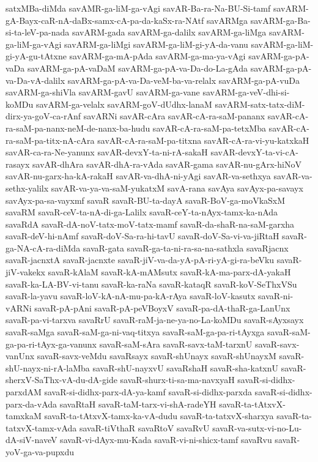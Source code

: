 {satxMBa-diMda
savAMR-ga-liM-ga-vAgi
savAR-Ba-ra-Na-BU-Si-tamf
savARM-gA-Bayx-caR-nA-daBx-samx-cA-pa-da-kaSx-ra-NAtf
savARMga
savARM-ga-Ba-si-ta-leV-pa-nada
savARM-gada
savARM-ga-dalilx
savARM-ga-liMga
savARM-ga-liM-ga-vAgi
savARM-ga-liMgi
savARM-ga-liM-gi-yA-da-vanu
savARM-ga-liM-gi-yA-gu-tAtxne
savARM-ga-mA-pAda
savARM-ga-ma-ya-vAgi
savARM-ga-pA-vaDa
savARM-ga-pA-vaDaM
savARM-ga-pA-va-Da-do-La-gAda
savARM-ga-pA-va-Da-vA-dalilx
savARM-ga-pA-va-Da-veM-ba-va-relalx
savARM-ga-pA-vuDa
savARM-ga-shiVla
savARM-gavU
savARM-ga-vane
savARM-ga-veV-dhi-si-koMDu
savARM-ga-velalx
savARM-goV-dUdhx-lanaM
savARM-satx-tatx-diM-dirx-ya-goV-ca-rAnf
savARNi
savAR-cAra
savAR-cA-ra-saM-pananx
savAR-cA-ra-saM-pa-nanx-neM-de-nanx-ba-hudu
savAR-cA-ra-saM-pa-tetxMba
savAR-cA-ra-saM-pa-titx-nA-cAra
savAR-cA-ra-saM-pa-titxna
savAR-cA-ra-vi-yu-katxkaH
savAR-ca-ra-Ne-yanunx
savAR-devxY-ta-ni-rA-sakaH
savAR-devxY-ta-vi-cA-rasayx
savAR-dhAra
savAR-dhA-ra-vAda
savAR-gama
savAR-nu-gArx-hiNoV
savAR-nu-garx-ha-kA-rakaH
savAR-va-dhA-ni-yAgi
savAR-va-sethxya
savAR-va-sethx-yalilx
savAR-va-ya-va-saM-yukatxM
savA-rana
savAya
savAyx-pa-savayx
savAyx-pa-sa-vayxmf
savaR
savaR-BU-ta-dayA
savaR-BoV-ga-moVkaSxM
savaRM
savaR-ceV-ta-nA-di-ga-Lalilx
savaR-ceY-ta-nAyx-tamx-ka-nAda
savaRdA
savaR-dA-noV-tatx-moV-tatx-mamf
savaR-da-shaR-na-saM-garxha
savaR-deV-hi-nAmf
savaR-doV-Sa-ra-hi-tavU
savaR-doV-Sa-vi-va-jiRtaH
savaR-ga-NA-cA-ra-diMda
savaR-gata
savaR-ga-ta-ni-ra-sa-na-sathxla
savaRjacnx
savaR-jacnxtA
savaR-jacnxte
savaR-jiV-va-da-yA-pA-ri-yA-gi-ra-beVku
savaR-jiV-vakekx
savaR-kAlaM
savaR-kA-mAMsutx
savaR-kA-ma-parx-dA-yakaH
savaR-ka-LA-BV-vi-tanu
savaR-ka-raNa
savaR-kataqR
savaR-koV-SeThxVSu
savaR-la-yavu
savaR-loV-kA-nA-mu-pa-kA-rAya
savaR-loV-kasutx
savaR-ni-vARNi
savaR-pA-pAni
savaR-pA-peVBoyxV
savaR-pa-dA-thaR-ga-LanUnx
savaR-pa-vi-tarxva
savaRrU
savaR-raM-ja-ne-ya-no-La-koMDu
savaR-sAyxsayx
savaR-saMga
savaR-saM-ga-ni-vaq-titxya
savaR-saM-ga-pa-ri-tAyxga
savaR-saM-ga-pa-ri-tAyx-ga-vanunx
savaR-saM-sAra
savaR-savx-taM-tarxnU
savaR-savx-vanUnx
savaR-savx-veMdu
savaRsayx
savaR-shUnayx
savaR-shUnayxM
savaR-shU-nayx-ni-rA-laMba
savaR-shU-nayxvU
savaRshaH
savaR-sha-katxnU
savaR-sherxV-SaThx-vA-du-dA-gide
savaR-shurx-ti-sa-ma-navxyaH
savaR-si-didhx-parxdAM
savaR-si-didhx-parx-dA-ya-kamf
savaR-si-didhx-parxda
savaR-si-didhx-parx-da-vAda
savaRtaH
savaR-taM-tarx-vi-shA-radeYH
savaR-ta-tAtxvX-tamxkaM
savaR-ta-tAtxvX-tamx-ka-vA-dudu
savaR-ta-tatxvX-sharxya
savaR-ta-tatxvX-tamx-vAda
savaR-tiVthaR
savaRtoV
savaRvU
savaR-va-sutx-vi-no-Lu-dA-siV-naveV
savaR-vi-dAyx-mu-Kada
savaR-vi-ni-shicx-tamf
savaRvu
savaR-yoV-ga-va-pupxdu
}
